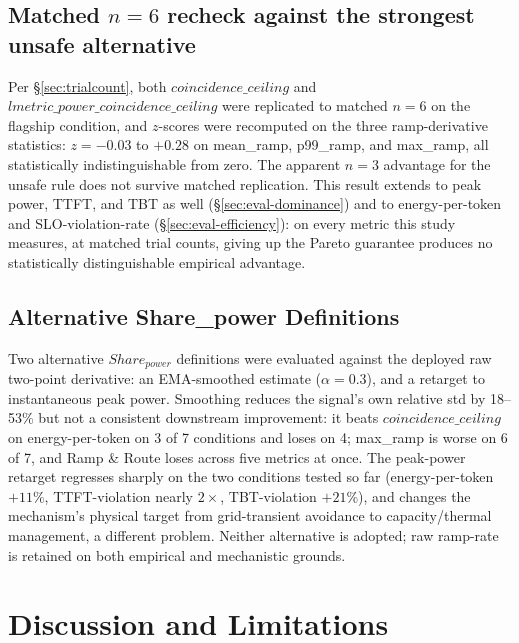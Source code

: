 \documentclass[sigconf,review,anonymous]{acmart}
\begin{document}
\subsection{Matched $n{=}6$ recheck against the strongest unsafe alternative}
\label{sec:eval-matched}

Per \S\ref{sec:trialcount}, both $\mathit{coincidence\_ceiling}$ and
$\mathit{lmetric\_power\_coincidence\_ceiling}$ were replicated to matched $n{=}6$ on the
flagship condition, and $z$-scores were recomputed on the three ramp-derivative statistics:
$z = -0.03$ to $+0.28$ on mean\_ramp, p99\_ramp, and max\_ramp, all statistically
indistinguishable from zero. The apparent $n{=}3$ advantage for the unsafe rule does not
survive matched replication. This result extends to peak power, TTFT, and TBT as well
(\S\ref{sec:eval-dominance}) and to energy-per-token and SLO-violation-rate
(\S\ref{sec:eval-efficiency}): on every metric this study measures, at matched trial counts,
giving up the Pareto guarantee produces no statistically distinguishable empirical advantage.

\subsection{Alternative Share\_power Definitions}
\label{sec:eval-sharepower}

Two alternative $\mathit{Share_{power}}$ definitions were evaluated against the deployed raw
two-point derivative: an EMA-smoothed estimate ($\alpha{=}0.3$), and a retarget to
instantaneous peak power. Smoothing reduces the signal's own relative std by 18--53\% but not
a consistent downstream improvement: it beats $\mathit{coincidence\_ceiling}$ on
energy-per-token on 3 of 7 conditions and loses on 4; max\_ramp is worse on 6 of 7, and Ramp \&
Route loses across five metrics at once. The peak-power retarget regresses sharply on the two
conditions tested so far (energy-per-token $+11\%$, TTFT-violation nearly $2\times$,
TBT-violation $+21\%$), and changes the mechanism's physical target from grid-transient
avoidance to capacity/thermal management, a different problem. Neither alternative is adopted;
raw ramp-rate is retained on both empirical and mechanistic grounds.

\vspace{-3pt}
\section{Discussion and Limitations}
\label{sec:discussion}
\end{document}
